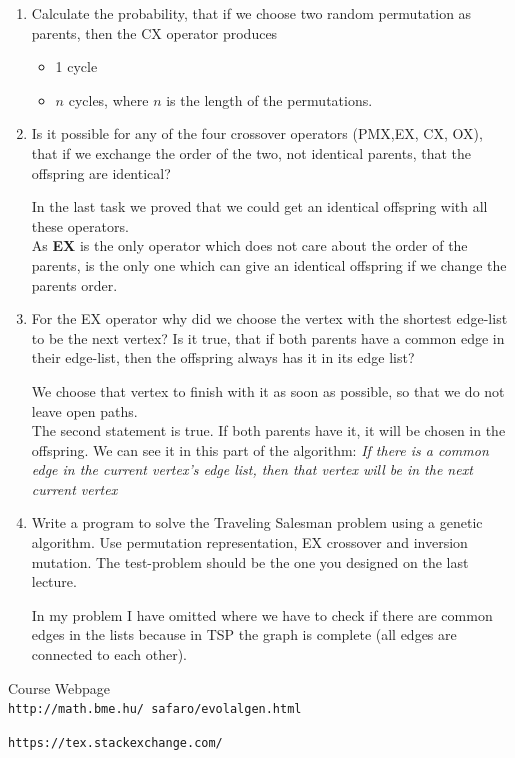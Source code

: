 \documentclass[12pt,english]{article}
\newenvironment{statement}{\fontfamily{ptm}\selectfont}{\par}
\begin{document}
\begin{enumerate}

	\item
		\begin{statement}
		Calculate the probability, that if we choose two random permutation as parents, then the CX operator produces
			\begin{itemize}
				\item 1 cycle
				\item $n$ cycles, where $n$ is the length of the permutations.
			\end{itemize}
		\end{statement}

	\item
		\begin{statement}
		Is it possible for any of the four crossover operators (PMX,EX, CX, OX), that if we exchange the order of the two, not identical parents, that the offspring are identical?
		\end{statement}
		In the last task we proved that we could get an identical offspring with all these operators. \\
		As \textbf{EX} is the only operator which does not care about the order of the parents, is the only one which can give an identical offspring if we change the parents order.

	\item
		\begin{statement}
		For the EX operator why did we choose the vertex with the shortest edge-list to be the next vertex? Is it true, that if both parents have a common edge in their edge-list, then the offspring always has it in its edge list?
		\end{statement}

		We choose that vertex to finish with it as soon as possible, so that we do not leave open paths. \\
		The second statement is true. If both parents have it, it will be chosen in the offspring. We can see it in this part of the algorithm:
		\emph{If there is a common edge in the current vertex’s edge list, then that vertex will be in the next current vertex}
	\item
		\begin{statement}
		Write a program to solve the Traveling Salesman problem using a genetic algorithm. Use permutation representation, EX crossover and inversion mutation. The test-problem should be the one you designed on the last lecture.
		\end{statement}
		In my problem I have omitted where we have to check if there are common edges in the lists because in TSP the graph is complete (all edges are connected to each other).



\end{enumerate}


\begin{thebibliography}{9}

Course Webpage
\\\texttt{http://math.bme.hu/~safaro/evolalgen.html}


\texttt{https://tex.stackexchange.com/}


\end{thebibliography}
\end{document}
